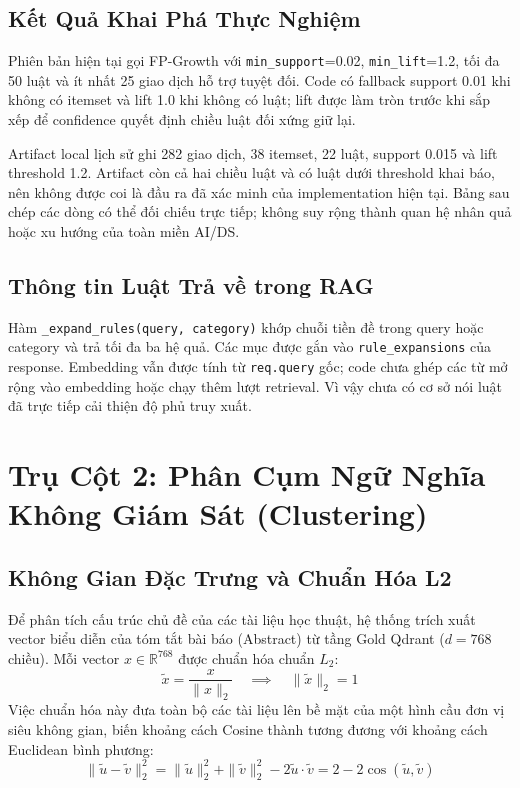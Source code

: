 \subsection{Kết Quả Khai Phá Thực Nghiệm}
Phiên bản hiện tại gọi FP-Growth với \texttt{min\_support}=0.02, \texttt{min\_lift}=1.2, tối đa 50 luật và ít nhất 25 giao dịch hỗ trợ tuyệt đối. Code có fallback support 0.01 khi không có itemset và lift 1.0 khi không có luật; lift được làm tròn trước khi sắp xếp để confidence quyết định chiều luật đối xứng giữ lại.

Artifact local lịch sử ghi 282 giao dịch, 38 itemset, 22 luật, support 0.015 và lift threshold 1.2. Artifact còn cả hai chiều luật và có luật dưới threshold khai báo, nên không được coi là đầu ra đã xác minh của implementation hiện tại. Bảng sau chép các dòng có thể đối chiếu trực tiếp; không suy rộng thành quan hệ nhân quả hoặc xu hướng của toàn miền AI/DS.


\subsection{Thông tin Luật Trả về trong RAG}
Hàm \texttt{\_expand\_rules(query, category)} khớp chuỗi tiền đề trong query hoặc category và trả tối đa ba hệ quả. Các mục được gắn vào \texttt{rule\_expansions} của response. Embedding vẫn được tính từ \texttt{req.query} gốc; code chưa ghép các từ mở rộng vào embedding hoặc chạy thêm lượt retrieval. Vì vậy chưa có cơ sở nói luật đã trực tiếp cải thiện độ phủ truy xuất.

\section{Trụ Cột 2: Phân Cụm Ngữ Nghĩa Không Giám Sát (Clustering)}

\subsection{Không Gian Đặc Trưng và Chuẩn Hóa L2}
Để phân tích cấu trúc chủ đề của các tài liệu học thuật, hệ thống trích xuất vector biểu diễn của tóm tắt bài báo (Abstract) từ tầng Gold Qdrant ($d = 768$ chiều). Mỗi vector $x \in \mathbb{R}^{768}$ được chuẩn hóa chuẩn $L_2$:
\begin{equation}
  \tilde{x} = \frac{x}{\|x\|_2} \quad \implies \quad \|\tilde{x}\|_2 = 1
\end{equation}
Việc chuẩn hóa này đưa toàn bộ các tài liệu lên bề mặt của một hình cầu đơn vị siêu không gian, biến khoảng cách Cosine thành tương đương với khoảng cách Euclidean bình phương:
\begin{equation}
  \|\tilde{u} - \tilde{v}\|_2^2 = \|\tilde{u}\|_2^2 + \|\tilde{v}\|_2^2 - 2 \tilde{u} \cdot \tilde{v} = 2 - 2\cos(\tilde{u}, \tilde{v})
\end{equation}

